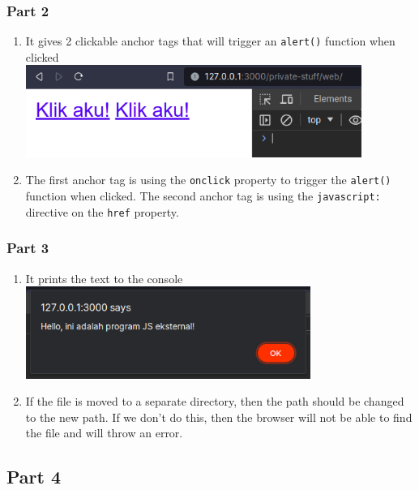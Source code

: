 \documentclass[12pt,titlepage]{article}
\begin{document}
\subsubsection{Part 2}
\begin{enumerate}
    \item {
        It gives 2 clickable anchor tags that will trigger an \texttt{alert()} function when clicked\\
        \includegraphics[height=3cm]{./images/p3.2-n1.png}
    }
    \item {
        The first anchor tag is using the \texttt{onclick} property to trigger the \texttt{alert()} function when clicked.
        The second anchor tag is using the \texttt{javascript:} directive on the \texttt{href} property.
    }
\end{enumerate}

\subsubsection{Part 3}
\begin{enumerate}
    \item {
        It prints the text to the console\\
        \includegraphics[height=3cm]{./images/p3.3-n1.png}
    }
    \item {
        If the file is moved to a separate directory, then the path should be changed to the new path.
        If we don't do this, then the browser will not be able to find the file and will throw an error.
    }
\end{enumerate}

\subsection{Part 4}
\end{document}

